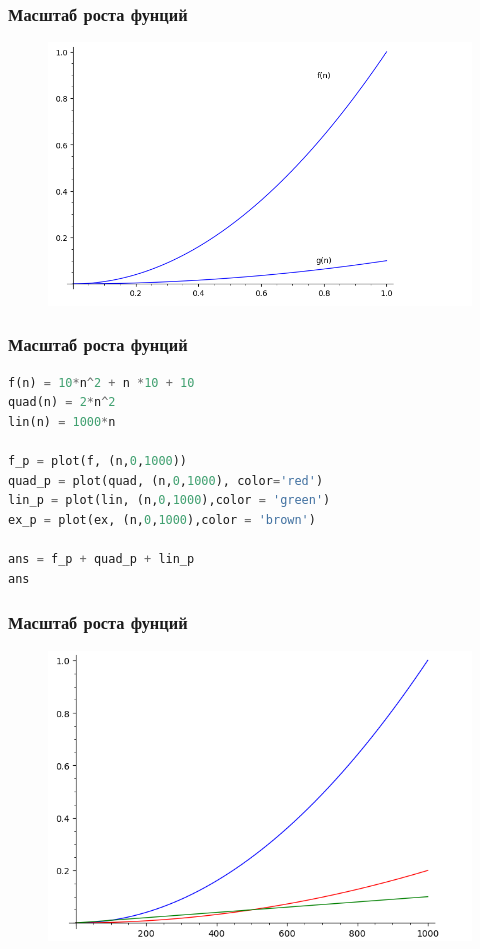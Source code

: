 \documentclass[russian, 12pt]{beamer}
\begin{document}
\begin{frame}
\frametitle{Масштаб роста фунций}
\begin{figure}
\includegraphics[width=\linewidth]{img/complexity_3.png}
\end{figure}
\end{frame}
\begin{frame}[fragile]
\frametitle{Масштаб роста фунций}
\begin{lstlisting}[language=Python]
f(n) = 10*n^2 + n *10 + 10
quad(n) = 2*n^2
lin(n) = 1000*n

f_p = plot(f, (n,0,1000))
quad_p = plot(quad, (n,0,1000), color='red')
lin_p = plot(lin, (n,0,1000),color = 'green')
ex_p = plot(ex, (n,0,1000),color = 'brown')

ans = f_p + quad_p + lin_p
ans
\end{lstlisting}
\end{frame}
\begin{frame}
\frametitle{Масштаб роста фунций}
\begin{figure}
\includegraphics[width=\linewidth]{img/complexity_4.png}
\end{figure}
\end{frame}
\end{document}
